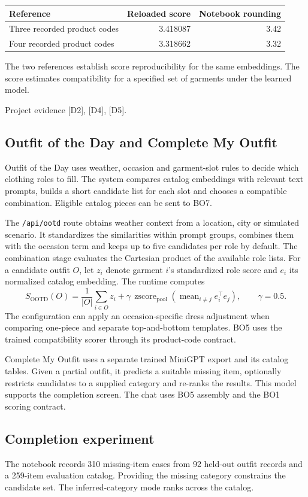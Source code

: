 \documentclass[11pt,a4paper]{article}
\newcommand{\src}[1]{\par{\footnotesize\textcolor{muted}{Project evidence #1.}}\par}
\newcommand{\file}[1]{\nolinkurl{#1}}
\begin{document}
\begin{tabularx}{\linewidth}{@{}Yrr@{}}
\toprule
\textbf{Reference} & \textbf{Reloaded score} & \textbf{Notebook rounding} \\
\midrule
Three recorded product codes & 3.418087 & 3.42 \\
Four recorded product codes & 3.318662 & 3.32 \\
\bottomrule
\end{tabularx}

The two references establish score reproducibility for the same embeddings. The score estimates compatibility for a specified set of garments under the learned model.
\src{[D2], [D4], [D5]}

\clearpage
\subsection*{Outfit of the Day and Complete My Outfit}
Outfit of the Day uses weather, occasion and garment-slot rules to decide which clothing roles to fill. The system compares catalog embeddings with relevant text prompts, builds a short candidate list for each slot and chooses a compatible combination. Eligible catalog pieces can be sent to BO7.

The \file{/api/ootd} route obtains weather context from a location, city or simulated scenario. It standardizes the similarities within prompt groups, combines them with the occasion term and keeps up to five candidates per role by default. The combination stage evaluates the Cartesian product of the available role lists. For a candidate outfit \(O\), let \(z_i\) denote garment \(i\)'s standardized role score and \(e_i\) its normalized catalog embedding. The runtime computes
\[
  S_{\mathrm{OOTD}}(O)=\frac{1}{|O|}\sum_{i\in O} z_i
      +\gamma\,\operatorname{zscore}_{\mathrm{pool}}\!
        \left(\operatorname{mean}_{i\ne j} e_i^\top e_j\right),
  \qquad \gamma=0.5.
\]
The configuration can apply an occasion-specific dress adjustment when comparing one-piece and separate top-and-bottom templates. BO5 uses the trained compatibility scorer through its product-code contract.

Complete My Outfit uses a separate trained MiniGPT export and its catalog tables. Given a partial outfit, it predicts a suitable missing item, optionally restricts candidates to a supplied category and re-ranks the results. This model supports the completion screen. The chat uses BO5 assembly and the BO1 scoring contract.

\subsection*{Completion experiment}
The notebook records 310 missing-item cases from 92 held-out outfit records and a 259-item evaluation catalog. Providing the missing category constrains the candidate set. The inferred-category mode ranks across the catalog.
\end{document}

